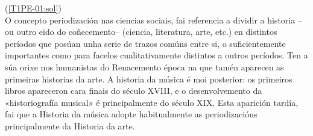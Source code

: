 %
%
    {%
    (\ref{T1PE-01:sol}) {\color{orange}{\hrulefill}}
    \\ \small{%
    O concepto periodización nas ciencias sociais, fai referencia a dividir a historia --ou outro eido do coñecemento-- (ciencia, literatura, arte, etc.) en distintos períodos que posúan unha serie de trazos comúns entre si, o suficientemente importantes como para facelos cualitativamente distintos a outros períodos. Ten a súa orixe nos humanistas do Renacemento época na que tamén aparecen as primeiras historias da arte. A historia da música é moi posterior: os primeiros libros apareceron cara finais do século XVIII, e o desenvolvemento da «historiografía musical» é principalmente do século XIX. Esta aparición tardía, fai que a Historia da música adopte habitualmente as periodizacións principalmente da Historia da arte.
    {\color{orange}{\hrulefill}}
    }
    }
%
